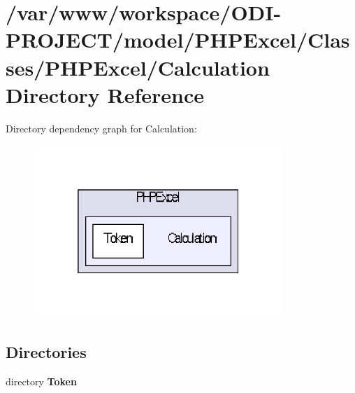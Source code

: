 \section{/var/www/workspace/\+O\+D\+I-\/\+P\+R\+O\+J\+E\+C\+T/model/\+P\+H\+P\+Excel/\+Classes/\+P\+H\+P\+Excel/\+Calculation Directory Reference}
\label{dir_7c91c5eab8942557159849d38d464517}
Directory dependency graph for Calculation\+:\nopagebreak
\begin{figure}[H]
\begin{center}
\leavevmode
\includegraphics[width=268pt]{dir_7c91c5eab8942557159849d38d464517_dep}
\end{center}
\end{figure}
\subsection*{Directories}
\begin{DoxyCompactItemize}
\item 
directory {\bf Token}
\end{DoxyCompactItemize}
